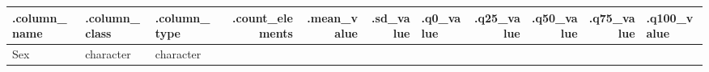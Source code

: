 \documentclass[
]{article}
\begin{document}
\begin{longtable}[]{@{}lllrrrlrrrl@{}}
\toprule
\begin{minipage}[b]{0.10\columnwidth}\raggedright
.column\_name\strut
\end{minipage} & \begin{minipage}[b]{0.07\columnwidth}\raggedright
.column\_class\strut
\end{minipage} & \begin{minipage}[b]{0.06\columnwidth}\raggedright
.column\_type\strut
\end{minipage} & \begin{minipage}[b]{0.08\columnwidth}\raggedleft
.count\_elements\strut
\end{minipage} & \begin{minipage}[b]{0.06\columnwidth}\raggedleft
.mean\_value\strut
\end{minipage} & \begin{minipage}[b]{0.05\columnwidth}\raggedleft
.sd\_value\strut
\end{minipage} & \begin{minipage}[b]{0.07\columnwidth}\raggedright
.q0\_value\strut
\end{minipage} & \begin{minipage}[b]{0.05\columnwidth}\raggedleft
.q25\_value\strut
\end{minipage} & \begin{minipage}[b]{0.05\columnwidth}\raggedleft
.q50\_value\strut
\end{minipage} & \begin{minipage}[b]{0.05\columnwidth}\raggedleft
.q75\_value\strut
\end{minipage} & \begin{minipage}[b]{0.06\columnwidth}\raggedright
.q100\_value\strut
\end{minipage}\tabularnewline
\midrule
\endhead
\begin{minipage}[t]{0.10\columnwidth}\raggedright
Sex\strut
\end{minipage} & \begin{minipage}[t]{0.07\columnwidth}\raggedright
character\strut
\end{minipage} & \begin{minipage}[t]{0.06\columnwidth}\raggedright
character\strut
\end{minipage} & \begin{minipage}[t]{0.08\columnwidth}\raggedleft
250\strut
\end{minipage} & \begin{minipage}[t]{0.06\columnwidth}\raggedleft

\end{minipage}
\end{longtable}
\end{document}
